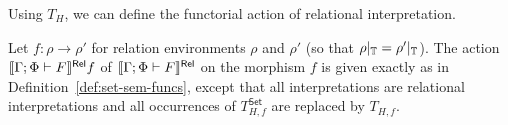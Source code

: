 \documentclass{lmcs}
\theoremstyle{plain}\newtheorem{satz}[thm]{Satz}
\newcommand{\inl}{\mathsf{inl}}
\newcommand{\inr}{\mathsf{inr}}
\newcommand{\set}{\mathsf{Set}}
\renewcommand{\id}{\mathit{id}}
\begin{document}
Using $T_H$, we can define the functorial action of relational
interpretation.
\begin{defi}\label{def:rel-sem-funcs}
Let $f: \rho \to \rho'$ for relation environments $\rho$ and $\rho'$
(so that $\rho|_{\mathbb{T}} = \rho'|_{\mathbb{T}}$). The action
$\llbracket{\Gamma;\Phi \vdash F}\rrbracket^{\mathsf{Rel}}f$ of $\llbracket{\Gamma;\Phi \vdash F}\rrbracket^{\mathsf{Rel}}$ on
the morphism $f$ is given exactly as in
Definition~\ref{def:set-sem-funcs}, except that all interpretations
are relational interpretations and all occurrences of $T^\set_{H,f}$
are replaced by $T_{H,f}$.
\begin{comment}
as follows:
\begin{itemize}
\item If \,$\Gamma;\Phi \vdash \zerot$ then $\relsem{\Gamma;\Phi \vdash
  \zerot}f = \id_0$
\item If\, $\Gamma;\Phi \vdash \onet$ then $\relsem{\Gamma;\Phi \vdash
  \onet}f = \id_1$
\item If \,$\Gamma; \Phi
  \vdash \Nat^{\ol{\alpha}}\,F\,G$ then
  $\relsem{\Gamma; \Phi
    \vdash \Nat^{\ol{\alpha}}\,F\,G} f =$\\
\hspace*{0.2in} $\lambda t : \relsem{\Gamma;\Phi \vdash
    \Nat^{\ol{\alpha}}\,F\,G}\rho.\, 
  (\lambda \ol{A}. \relsem{\Gamma; \Phi,\ol\alpha \vdash G}f[\ol{\alpha
      := id_A}]) \circ t$  
\item If \,$\Gamma;\Phi \vdash \phi \ol{\tau}$, then
  $\relsem{\Gamma;\Phi \vdash \phi \ol{\tau}} f : \relsem{\Gamma;\Phi
  \vdash \phi \ol{\tau}}\rho \to \relsem{\Gamma;\Phi \vdash \phi
  \ol{\tau}}\rho' = (\rho\phi) \ol{\relsem{\Gamma;\Phi \vdash
    \tau}\rho} \to (\rho'\phi) \ol{\relsem{\Gamma;\Phi \vdash
    \tau}\rho'}$ is defined by $\relsem{\Gamma;\Phi \vdash \phi
  \tau{A}} f = (f\phi)_{\ol{\relsem{\Gamma;\Phi \vdash \tau}\rho'}}
  \,\circ\, (\rho\phi) \ol{\relsem{\Gamma;\Phi \vdash \tau}f} =
  (\rho'\phi) \ol{\relsem{\Gamma;\Phi \vdash \tau}f} \,\circ\, (f
  \phi)_{\ol{\relsem{\Gamma;\Phi \vdash \tau}\rho}}$
\item If\, $\Gamma;\Phi\vdash \sigma + \tau$ then $\relsem{\Gamma;\Phi
  \vdash \sigma + \tau}f$ is defined by $\relsem{\Gamma;\Phi \vdash
  \sigma + \tau}f(\inl\,x) = \inl\,(\relsem{\Gamma;\Phi \vdash
  \sigma}f x)$ and $\relsem{\Gamma;\Phi \vdash \sigma +
  \tau}f(\inr\,y) = \inr\,(\relsem{\Gamma;\Phi \vdash \tau}f y)$
\item If\, $\Gamma;\Phi\vdash \sigma \times \tau$ then
  $\relsem{\Gamma;\Phi \vdash \sigma \times \tau}f =
  \relsem{\Gamma;\Phi \vdash \sigma}f \times \relsem{\Gamma;\Phi
    \vdash \tau}f$
\item If\, $\Gamma;\Phi \vdash (\mu \phi^k.\lambda
  \ol{\alpha}. H)\ol{\tau}$ then $\relsem{\Gamma;\Phi \vdash (\mu
    \phi.\lambda \ol{\alpha}. H)\ol{\tau}} f = (\mu
  T_{H,f})\ol{\relsem{\Gamma;\Phi \vdash \tau}\rho'} \circ (\mu
  T_{H,\rho})\ol{\relsem{\Gamma;\Phi \vdash \tau}f} = (\mu
  T_{H,\rho'})\ol{\relsem{\Gamma;\Phi \vdash \tau}f} \circ (\mu
  T_{H,f})\ol{\relsem{\Gamma;\Phi \vdash \tau}\rho}$
\end{itemize}
\end{comment}
\end{defi}
\end{document}
